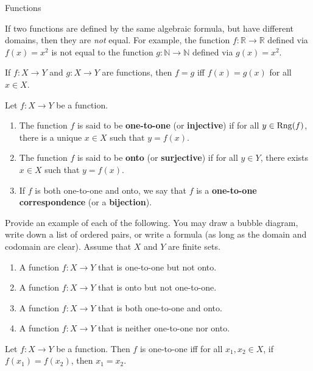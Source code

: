 \begin{section}{Functions}
\begin{remark}
If two functions are defined by the same algebraic formula, but have different domains, then they are \emph{not} equal.  For example, the function $f:\mathbb{R}\to \mathbb{R}$ defined via $f(x)=x^{2}$ is not equal to the function $g:\mathbb{N}\to\mathbb{N}$ defined via $g(x)=x^{2}$.
\end{remark}

\begin{theorem}
If $f:X\to Y$ and $g:X\to Y$ are functions, then $f=g$ iff $f(x)=g(x)$ for all $x\in X$.
\end{theorem}

\begin{definition}
Let $f:X\to Y$ be a function.
\begin{enumerate}
\item The function $f$ is said to be \textbf{one-to-one} (or \textbf{injective}) if for all $y\in \operatorname{Rng}(f)$, there is a unique $x\in X$ such that $y=f(x)$.
\item The function $f$ is said to be \textbf{onto} (or \textbf{surjective}) if for all $y\in Y$, there exists $x\in X$ such that $y=f(x)$.
\item If $f$ is both one-to-one and onto, we say that $f$ is a \textbf{one-to-one correspondence} (or a \textbf{bijection}).
\end{enumerate}
\end{definition}

\begin{exercise}
Provide an example of each of the following.  You may draw a bubble diagram, write down a list of ordered pairs, or write a formula (as long as the domain and codomain are clear).  Assume that $X$ and $Y$ are finite sets.
\begin{enumerate}
\item A function $f:X\to Y$ that is one-to-one but not onto.
\item A function $f:X\to Y$ that is onto but not one-to-one.
\item A function $f:X\to Y$ that is both one-to-one and onto.
\item A function $f:X\to Y$ that is neither one-to-one nor onto.
\end{enumerate}

\end{exercise}

\begin{theorem}
Let $f:X\to Y$ be a function.  Then $f$ is one-to-one iff for all $x_{1}, x_{2}\in X$, if $f(x_{1})=f(x_{2})$, then $x_{1}=x_{2}$.
\end{theorem}


\end{section}
